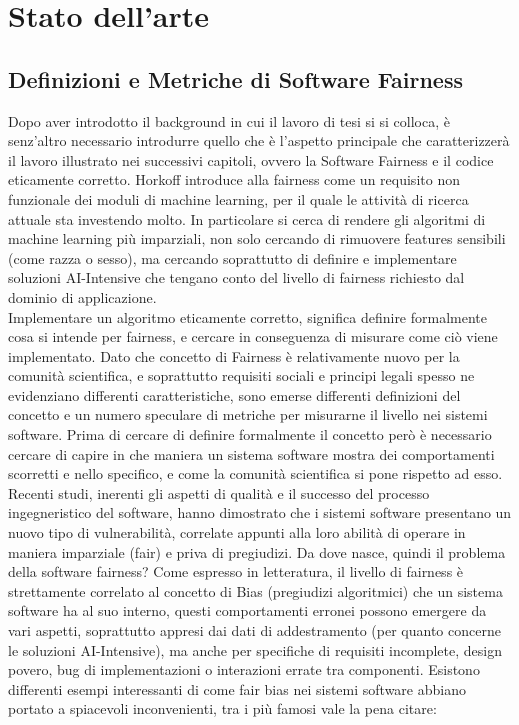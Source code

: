 

\chapter{Stato dell'arte} %


\section{Definizioni e Metriche di Software Fairness}
Dopo aver introdotto il background in cui il lavoro di tesi si si colloca, è senz'altro necessario introdurre quello che è l'aspetto principale che caratterizzerà il lavoro illustrato nei successivi capitoli, ovvero la Software Fairness e il codice eticamente corretto. Horkoff introduce alla fairness come un requisito non funzionale dei moduli di machine learning, per il quale  le attività di ricerca attuale sta investendo molto. In particolare si cerca di rendere gli algoritmi di machine learning più imparziali, non solo cercando di rimuovere features sensibili (come razza o sesso), ma cercando soprattutto di definire e implementare soluzioni AI-Intensive che tengano conto del livello di fairness richiesto dal dominio di applicazione\cite{NFRForML}.\\

Implementare un algoritmo eticamente corretto, significa definire formalmente cosa si intende per fairness, e cercare in conseguenza di misurare come ciò  viene implementato\cite{NFRForML}. Dato che concetto di Fairness è relativamente nuovo per la comunità scientifica, e soprattutto requisiti sociali e principi legali spesso ne evidenziano differenti caratteristiche,  sono emerse differenti definizioni del concetto e un numero speculare di metriche per misurarne il livello nei sistemi software\cite{evalFairClassification}. Prima di cercare di definire formalmente il concetto però è necessario cercare di capire in che maniera un sistema software mostra dei comportamenti scorretti e nello specifico, e come la comunità scientifica si pone rispetto ad esso.   \\

Recenti studi, inerenti gli aspetti di qualità e il successo del processo ingegneristico del software, hanno dimostrato che i sistemi software presentano un nuovo tipo di vulnerabilità, correlate appunti alla loro abilità di operare in maniera imparziale (fair) e priva di pregiudizi. Da dove nasce, quindi il problema della software fairness?  Come espresso in letteratura, il livello di fairness è strettamente correlato al concetto di Bias (pregiudizi algoritmici) che un sistema software ha al suo interno, questi comportamenti erronei possono emergere da vari aspetti, soprattutto appresi dai dati di addestramento (per quanto concerne le soluzioni AI-Intensive), ma anche per specifiche di requisiti incomplete, design povero, bug di implementazioni o interazioni errate tra componenti\cite{brun2018software}. Esistono differenti esempi interessanti di come fair bias nei sistemi software abbiano portato a spiacevoli inconvenienti, tra i più famosi vale la pena citare:

